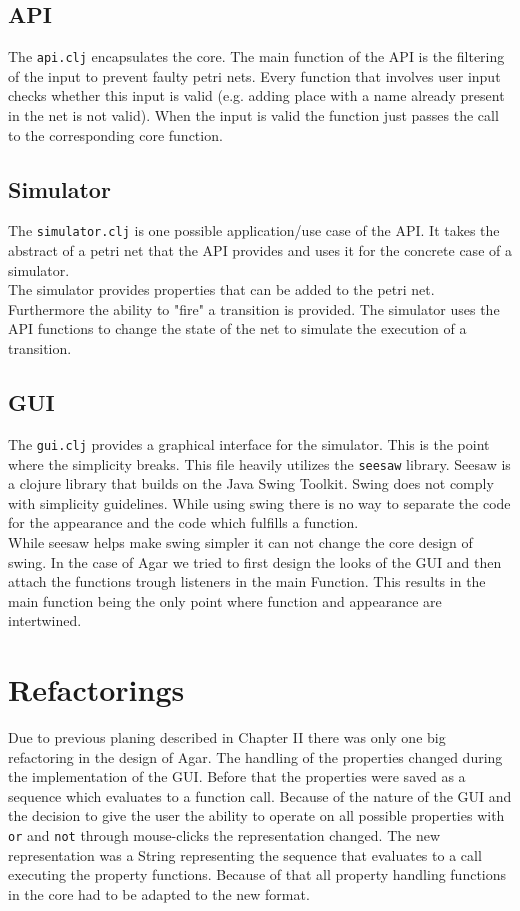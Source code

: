 \documentclass[twoside]{article}
\begin{document}
\begin{multicols}{2}
\subsection{API}
The \texttt{api.clj} encapsulates the core. The main function of the API is the filtering of the
input to prevent faulty petri nets. Every function that involves user input checks whether this 
input is valid (e.g. adding  place with a name already present in the net is not valid). When the input 
is valid the function just passes the call to the corresponding core function.

\subsection{Simulator}
The \texttt{simulator.clj} is one possible application/use case of the API.
It takes the abstract of a petri net that the API provides and uses it for the
concrete case of a simulator. \\
The simulator provides properties that can be added to the petri net. Furthermore
the ability to "fire" a transition is provided. The simulator uses the API functions to
change the state of the net to simulate the execution of a transition.

\subsection{GUI}
The \texttt{gui.clj} provides a graphical interface for the simulator. This is the point
where the simplicity breaks. This file heavily utilizes the \texttt{seesaw} library. Seesaw
is a clojure library that builds on the Java Swing Toolkit. Swing does not comply with simplicity
guidelines. While using swing there is no way to separate the code for the appearance and the code which fulfills 
a function. \\
While seesaw helps make swing simpler it can not change the core design of swing. In the case of Agar we tried
to first design the looks of the GUI and then attach the functions trough listeners in the main Function.
This results in the main function being the only point where function and appearance are intertwined. 

\section{Refactorings}
Due to previous planing described in Chapter II there was only one big refactoring in the design of Agar.
The handling of the properties changed during the implementation of the GUI. Before that the properties were
saved as a sequence which evaluates to a function call. Because of the nature of the GUI and the decision to give the
user the ability to operate on all possible properties with \texttt{or} and \texttt{not} through  mouse-clicks the
representation changed. The new representation was a String representing the sequence that evaluates to a call
executing the property functions. Because of that all property handling functions in the core had to be adapted to the new format.



\end{multicols}
\end{document}
